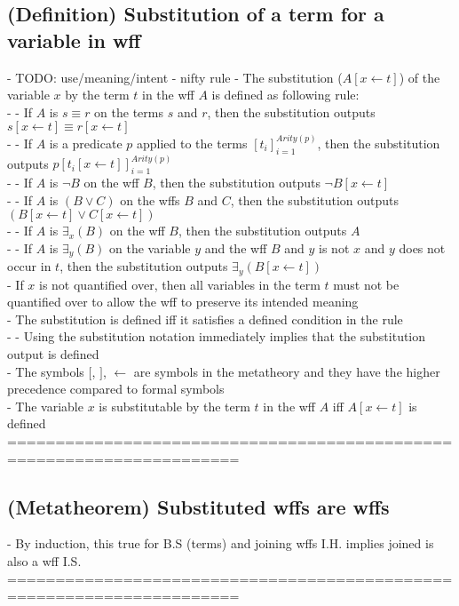 \documentclass{article}
\begin{document}
\subsection{(Definition) Substitution of a term for a variable in wff}
	- TODO: use/meaning/intent - nifty rule
	- The substitution ($A[x \leftarrow t]$) of the variable $x$ by the term $t$ in the wff $A$ is defined as following rule: \\
		- - If $A$ is $s \equiv r$ on the terms $s$ and $r$, then the substitution outputs $s[x \leftarrow t] \equiv r[x \leftarrow t]$ \\
		- - If $A$ is a predicate $p$ applied to the terms $[t_i]_{i=1}^{Arity(p)}$, then the substitution outputs $p [t_i[x \leftarrow t]]_{i=1}^{Arity(p)}$ \\
		- - If $A$ is $\lnot B$ on the wff $B$, then the substitution outputs $\lnot B[x \leftarrow t]$ \\
		- - If $A$ is $(B \lor C)$ on the wffs $B$ and $C$, then the substitution outputs $(B[x \leftarrow t] \lor C[x \leftarrow t])$\\
		- - If $A$ is $\exists_x(B)$ on the wff $B$, then the substitution outputs $A$ \\
		- - If $A$ is $\exists_y(B)$ on the variable $y$ and the wff $B$ and $y$ is not $x$ and $y$ does not occur in $t$, then the substitution outputs $\exists_y(B[x \leftarrow t])$\\
	- If $x$ is not quantified over, then all variables in the term $t$ must not be quantified over to allow the wff to preserve its intended meaning \\
	- The substitution is defined iff it satisfies a defined condition in the rule \\
		- - Using the substitution notation immediately implies that the substitution output is defined \\
	- The symbols $[$, $]$, $\leftarrow$ are symbols in the metatheory and they have the higher precedence compared to formal symbols \\
	- The variable $x$ is substitutable by the term $t$ in the wff $A$ iff $A[x \leftarrow t]$ is defined 
	======================================================================
\subsection{(Metatheorem) Substituted wffs are wffs}
	- By induction, this true for B.S (terms) and joining wffs I.H. implies joined is also a wff I.S. \\
	======================================================================
\end{document}
